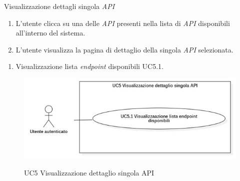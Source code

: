 \begin{usecase}{5}{Visualizzazione dettagli singola \textit{API}}\label{uc:visualizzazione-dettagli-singola-api}

    \usecasemain{}
        \begin{enumerate}
            \item L'utente clicca su una delle \textit{API} presenti nella lista di \textit{API} disponibili all'interno del sistema.
            \item L'utente visualizza la pagina di dettaglio della singola \textit{API} selezionata.
        \end{enumerate}

        \begin{enumerate}
            \item Visualizzazione lista \textit{endpoint} disponibili UC5.1.
        \end{enumerate}

\end{usecase}

\begin{figure}[!ht] 
    \centering 
    \includegraphics[width=\columnwidth, alt={Caso d'uso relativo alla visualizzazione del dettaglio di una singola API}]{images/usecase/UC5.jpg}
    \caption{UC5 Visualizzazione dettaglio singola API}\label{fig:uc:visualizzazione-dettaglio-singola-api}
  \end{figure}

  \pagebreak

